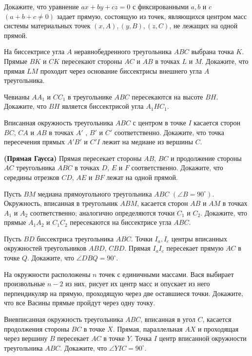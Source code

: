 \documentclass{article}
\begin{document}
\begin{enumerate_boxed}
        \item Докажите, что уравнение $ax + by + cz = 0$ с фиксированными $a, b$ и $c$ $(a + b + c \neq 0)$ задает прямую, состоящую из точек, являющихся центром масс системы материальных точек $(x, A), (y, B), (z, C)$, не лежащих на одной прямой.

        \item На биссектрисе угла $A$ неравнобедренного треугольника $ ABC $ выбрана точка $ K $.
        Прямые $ BK $ и $ CK $ пересекают стороны $ AC $ и $ AB $ в точках $ L $ и $ M $.
        Докажите, что прямая $ LM $ проходит через основание биссектрисы внешнего угла $ A $ треугольника.

        \item Чевианы $ AA_1 $ и $ CC_1 $ в треугольнике $ ABC $ пересекаются на высоте $ BH $.
        Докажите, что $ BH $ является биссектрисой угла $ A_{1}HC_1 $.

        \item Вписанная окружность треугольника $ ABC $ с центром в точке $ I $ касается сторон $ BC $, $ CA $ и $ AB $ в точках $ A' $ , $ B' $  и $ C' $  соответственно.
        Докажите, что точка пересечения прямых $ A' B' $  и $ C' I $ лежит на медиане из вершины $ C $.

        \item \textbf{(Прямая Гаусса)} Прямая пересекает стороны $ AB $, $ BC $ и продолжение стороны $ AC $ треугольника $ ABC $ в точках $ D $, $ E $ и $ F $ соответственно.
        Докажите, что середины отрезков $ CD $, $ AE $ и $ BF $ лежат на одной прямой.

        \item Пусть $ BM $ медиана прямоугольного треугольника $ ABC $ $(\angle B = 90^{\circ} )$.
        Окружность, вписанная в треугольник $ABM$, касается сторон $ AB $ и $ AM $ в точках $ A_1 $ и $ A_2 $ соответственно; аналогично определяются точки $ C_1 $ и $ C_2 $.
        Докажите, что прямые $ A_{1}A_2 $ и $ C_{1}C_2 $ пересекаются на биссектрисе угла $ ABC $.

        \item Пусть $ BD $ биссектриса треугольника $ ABC $.
        Точки $ I_a, I_c $ центры вписанных окружностей треугольников $ ABD $, $ CBD $.
        Прямая $ I_{a}I_c $ пересекает прямую $ AC $ в точке $ Q $.
        Докажите, что  $ \angle DBQ = 90^{\circ} $.

        \item На окружности расположены $ n $ точек с единичными массами.
        Вася выбирает произвольные $ n - 2 $ из них, рисует их центр масс и опускает из него перпендикуляр на прямую, проходящую через две оставшиеся точки.
        Докажите, что все Васины прямые пройдут через одну точку.

        \item Вневписанная окружность треугольника $ ABC $, вписанная в угол $ C $, касается продолжения стороны $ BC $ в точке $ X $.
        Прямая, параллельная $ AX $ и проходящая через вершину $ B $ пересекает $ AC $ в точке $ Y $.
        Точка $ I $ центр вписанной окружности треугольника $ ABC $.
        Докажите, что $\angle YIC = 90^\circ $.
    \end{enumerate_boxed}
\end{document}
